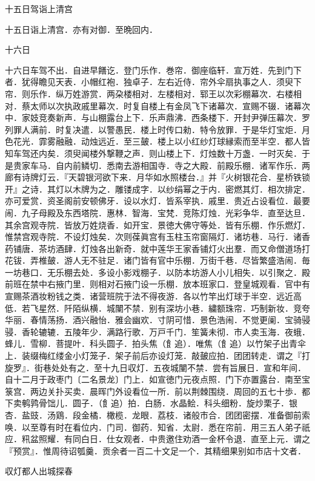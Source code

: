 \documentclass[]{article}
\begin{document}
十五日驾诣上清宫

十五日诣上清宫．亦有对御．至晩回内．

十六日

十六日车驾不出．自进早饍讫．登门乐作．巻帘．御座临轩．宣万姓．先到门下者．犹得瞻见天表．小帽红袍．独卓子．左右近侍．帘外伞扇执事之人．须臾下帘．则乐作．纵万姓游赏．两朶楼相对．左楼相对．郓王以次彩棚幕次．右楼相对．蔡太师以次执政戚里幕次．时复自楼上有金凤飞下诸幕次．宣赐不辍．诸幕次中．家妓竞奏新声．与山棚露台上下．乐声鼎沸．西条楼下．开封尹弹压幕次．罗列罪人满前．时复决遣．以警愚民．楼上时传口勑．特令放罪．于是华灯宝炬．月色花光．霏雾融融．动烛远近．至三皷．楼上以小红纱灯球縁索而至半空．都人皆知车驾还内矣．须臾闻楼外撃鞭之声．则山楼上下．灯烛数十万盏．一时灭矣．于是贵家车马．自内前鳞切．悉南去游相国寺．寺之大殿．前殿乐棚．诸军作乐．两廊有诗牌灯云．『天碧银河欲下来．月华如水照楼台．』并『火树银花合．星桥铁锁开』之诗．其灯以木牌为之．雕镂成字．以纱绢幂之于内．密燃其灯．相次排定．亦可爱赏．资圣阁前安顿佛牙．设以水灯．皆系宰执．戚里．贵近占设看位．最要闹．九子母殿及东西塔院．惠林．智海．宝梵．竞陈灯烛．光彩争华．直至达旦．其余宫观寺院．皆放万姓烧香．如开宝．景徳大佛守等处．皆有乐棚．作乐燃灯．惟禁宫观寺院．不设灯烛矣．次则葆眞宫有玉柱玉帘窗隔灯．诸坊巷．马行．诸香药铺唐．茶坊酒肆．灯烛各出新奇．就中莲华王家香铺灯火出羣．而又命僧道场打花钹．弄椎皷．游人无不驻足．诸门皆有官中乐棚．万街千巷．尽皆繁盛浩闹．毎一坊巷口．无乐棚去处．多设小影戏棚子．以防本坊游人小儿相失．以引聚之．殿前班在禁中右掖门里．则相对石掖门设一乐棚．放本班家口．登皇城观看．官中有宣赐茶酒妆粉钱之类．诸营班院于法不得夜游．各以竹竿出灯球于半空．远近高低．若飞星然．阡陌纵横．城闉不禁．别有深坊小巷．繍额珠帘．巧制新妆．竞夸华丽．春情荡扬．酒兴融怡．雅会幽欢．寸阴可惜．景色浩闹．不觉更阑．宝骑骎骎．香轮辘辘．五陵年少．满路行歌．万戸千门．笙簧未彻．市人卖玉海．夜蛾．蜂儿．雪柳．菩提叶．科头圆子．拍头焦（飠追）．唯焦（飠追）以竹架子出青伞上．装缀梅红缕金小灯笼子．架子前后亦设灯笼．敲皷应拍．团团转走．谓之『打旋罗』．街巷处处有之．至十九日収灯．五夜城闉不禁．尝有旨展日．宣和年间．自十二月于政枣门〔二名景龙〕门上．如宣徳门元夜点照．门下亦置露台．南至宝箓宫．两边关扑买卖．晨晖门外设看位一所．前以荆棘围绕．周回的五七十歩．都下卖鹌鹑骨饳儿．圆子．（飠追）拍．白肠．水晶鲙．科头细粉．旋炒栗子．银杏．盐豉．汤鶏．段金橘．橄榄．龙眼．荔枝．诸般市合．团团密摆．准备御前索唤．以至尊有时在看位内．门司．御药．知省．太尉．悉在帘前．用三五人弟子祇应．籸盆照耀．有同白日．仕女观者．中贵邀住劝酒一金杯令退．直至上元．谓之『预赏』．惟周待诏瓠羹．贡余者一百二十文足一个．其精细果别如市店十文者．

収灯都人出城探春
\end{document}
